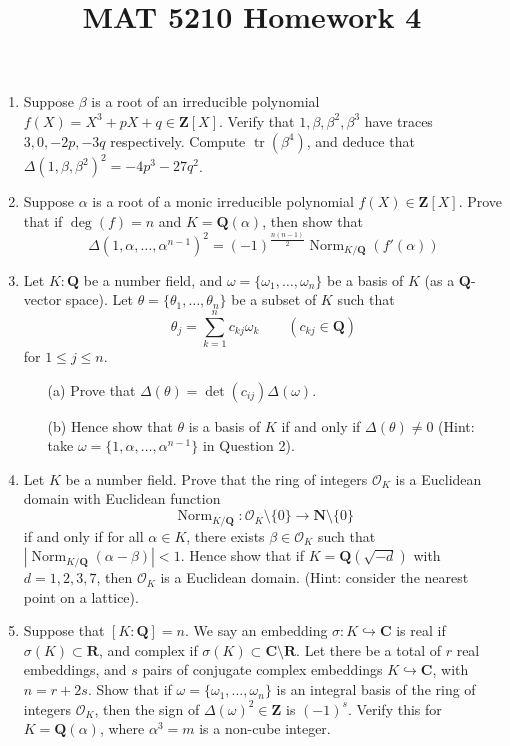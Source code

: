 \documentclass{article}
\title{MAT 5210 Homework 4}
\author{}
\date{}
\begin{document}
\maketitle

\begin{enumerate}
    \item Suppose $\beta$ is a root of an irreducible polynomial $f(X) = X^3 + pX + q \in \mathbf{Z}[X]$. Verify that $1, \beta, \beta^2, \beta^3$ have traces $3, 0, -2p, -3q$ respectively. Compute $\operatorname{tr}(\beta^4)$, and deduce that $\Delta(1, \beta, \beta^2)^2 = -4p^3 - 27q^2$.

    \item Suppose $\alpha$ is a root of a monic irreducible polynomial $f(X) \in \mathbf{Z}[X]$. Prove that if $\operatorname{deg}(f) = n$ and $K = \mathbf{Q}(\alpha)$, then show that
    \[
    \Delta(1, \alpha, \ldots, \alpha^{n-1})^2 = (-1)^{\frac{n(n-1)}{2}} \operatorname{Norm}_{K / \mathbf{Q}}(f'(\alpha))
    \]

    \item Let $K:\mathbf{Q}$ be a number field, and $\omega = \{\omega_1, \dots, \omega_n\}$ be a basis of $K$ (as a $\mathbf{Q}$-vector space). Let $\theta = \{\theta_1, \dots, \theta_n\}$ be a subset of $K$ such that
    $$\theta_j = \sum_{k=1}^n c_{kj} \omega_k \quad \quad (c_{kj} \in \mathbf{Q})$$
    for $1 \leq j \leq n$. 
    \begin{enumerate}
        \item[(a)] Prove that $\Delta(\theta) = \det(c_{ij})\Delta(\omega)$.
        \item[(b)] Hence show that $\theta$ is a basis of $K$ if and only if $\Delta(\theta) \neq 0$ (Hint: take $\omega = \{1, \alpha, \dots, \alpha^{n-1}\}$ in Question 2).
    \end{enumerate}
    
    \item Let $K$ be a number field. Prove that the ring of integers $\mathcal{O}_K$ is a Euclidean domain with Euclidean function
    \[
    \operatorname{Norm}_{K / \mathbf{Q}}: \mathcal{O}_K \setminus \{0\} \rightarrow \mathbf{N} \setminus \{0\}
    \]
    if and only if for all $\alpha \in K$, there exists $\beta \in \mathcal{O}_K$ such that $\left|\operatorname{Norm}_{K / \mathbf{Q}}(\alpha - \beta)\right| < 1$. Hence show that if $K = \mathbf{Q}(\sqrt{-d})$ with $d = 1, 2, 3, 7$, then $\mathcal{O}_K$ is a Euclidean domain. (Hint: consider the nearest point on a lattice).

    \item Suppose that $[K: \mathbf{Q}] = n$. We say an embedding $\sigma: K \hookrightarrow \mathbf{C}$ is real if $\sigma(K) \subset \mathbf{R}$, and complex if $\sigma(K) \subset \mathbf{C} \setminus \mathbf{R}$. Let there be a total of $r$ real embeddings, and $s$ pairs of conjugate complex embeddings $K \hookrightarrow \mathbf{C}$, with $n = r + 2s$. Show that if $\omega = \{\omega_1, \ldots, \omega_n\}$ is an integral basis of the ring of integers $\mathcal{O}_K$, then the sign of $\Delta(\omega)^2 \in \mathbf{Z}$ is $(-1)^s$. Verify this for $K = \mathbf{Q}(\alpha)$, where $\alpha^3 = m$ is a non-cube integer.


\end{enumerate}
\end{document}
